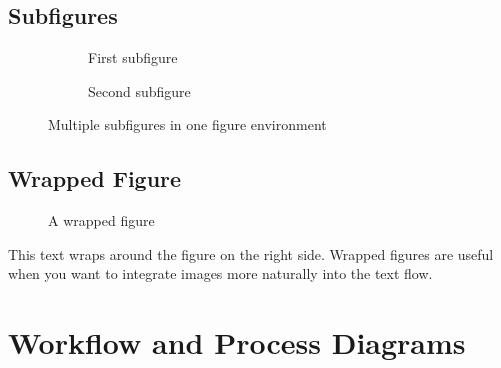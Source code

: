 \documentclass[a4paper,12pt]{article}
\begin{document}
\subsection{Subfigures}
\begin{figure}[H]
\centering
\begin{subfigure}[b]{0.45\textwidth}
\centering
{}
\caption{First subfigure}
\label{fig:sub1}
\end{subfigure}
\hfill
\begin{subfigure}[b]{0.45\textwidth}
\centering
{}
\caption{Second subfigure}
\label{fig:sub2}
\end{subfigure}
\caption{Multiple subfigures in one figure environment}
\label{fig:combined}
\end{figure}

\subsection{Wrapped Figure}
\begin{figure}
\centering
{}
\caption{A wrapped figure}
\label{fig:wrapped}
\end{figure}

\lipsum[3]

This text wraps around the figure on the right side. Wrapped figures are useful
when you want to integrate images more naturally into the text flow.

\section{Workflow and Process Diagrams}
\end{document}
